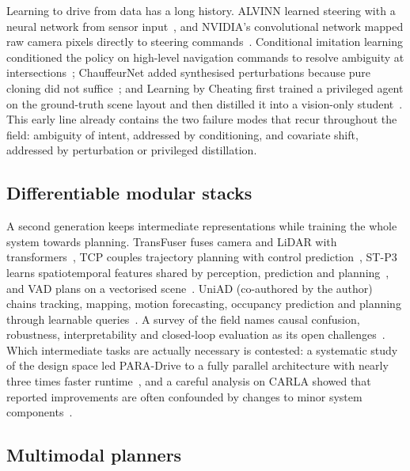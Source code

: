 Learning to drive from data has a long history. ALVINN learned steering with a neural network from sensor input~\cite{pomerleau1988alvinn}, and NVIDIA's convolutional network mapped raw camera pixels directly to steering commands~\cite{bojarski2016end}. Conditional imitation learning conditioned the policy on high-level navigation commands to resolve ambiguity at intersections~\cite{codevilla2018end}; ChauffeurNet added synthesised perturbations because pure cloning did not suffice~\cite{bansal2019chauffeurnet}; and Learning by Cheating first trained a privileged agent on the ground-truth scene layout and then distilled it into a vision-only student~\cite{chen2019lbc}. This early line already contains the two failure modes that recur throughout the field: ambiguity of intent, addressed by conditioning, and covariate shift, addressed by perturbation or privileged distillation.

\subsection{Differentiable modular stacks}

A second generation keeps intermediate representations while training the whole system towards planning. TransFuser fuses camera and LiDAR with transformers~\cite{chitta2023transfuser}, TCP couples trajectory planning with control prediction~\cite{wu2022tcp}, ST-P3 learns spatiotemporal features shared by perception, prediction and planning~\cite{hu2022stp3}, and VAD plans on a vectorised scene~\cite{jiang2023vad}. UniAD (co-authored by the author) chains tracking, mapping, motion forecasting, occupancy prediction and planning through learnable queries~\cite{hu2023uniad}. A survey of the field names causal confusion, robustness, interpretability and closed-loop evaluation as its open challenges~\cite{chen2024e2esurvey}. Which intermediate tasks are actually necessary is contested: a systematic study of the design space led PARA-Drive to a fully parallel architecture with nearly three times faster runtime~\cite{weng2024paradrive}, and a careful analysis on CARLA showed that reported improvements are often confounded by changes to minor system components~\cite{jaeger2023hidden}.

\subsection{Multimodal planners}


